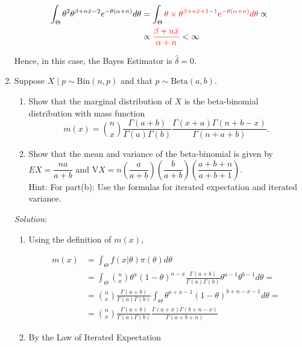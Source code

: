 \documentclass[11pt]{article}
\begin{document}
\begin{enumerate}
\begin{align*}
	\int_{\Theta}{\theta^{2} \theta^{\beta+n\bar{x}-2}e^{-\theta(\alpha+n)} d\theta}	
	&= \int_{\Theta} \textcolor{red}{\theta \times {\theta^{\beta+n\bar{x}+1-1}e^{-\theta(\alpha+n)} d\theta}} \propto \\
																										&\propto \textcolor{red}{\frac{\beta+n\bar{x}}{\alpha+n}} < \infty
\end{align*}

Hence, in this case, the Bayes Estimator is $\hat{\delta} = 0$.

\item Suppose $X\mid p \sim \text{Bin}(n,p)$ and that $p \sim \text{Beta}(a,b).$
\begin{enumerate}
\item Show that the marginal distribution of $X$ is the beta-binomial distribution with mass function 
$$m(x) = {n \choose x} \dfrac{\Gamma(a+b)}{\Gamma(a)\Gamma(b)}
\dfrac{\Gamma(x+a)\Gamma(n+b-x)}{\Gamma(n+a+b)}.
$$
\item Show that the mean and variance of the beta-binomial is given by
$EX = \dfrac{na}{a+b}$ and $\text{V}X = n \left(\dfrac{a}{a+b}\right)\left(\dfrac{b}{a+b}\right)\left(\dfrac{a+b+n}{a+b+1}\right).$\\
Hint: For part(b): Use the formulas for iterated expectation and iterated variance. 
\end{enumerate}

\emph{Solution}:

\begin{enumerate}

\item Using the definition of $m(x)$,

\begin{align*}
m(x)	&= \int_{\Theta}{f(x|\theta)\pi(\theta)d\theta} \\
			&= \int_{\Theta}{{n \choose x}\theta^{x}(1-\theta)^{n-x} \frac{\Gamma(a+b)}{\Gamma(a)\Gamma(b)}\theta^{a-1}\theta^{b-1}d\theta} = \\
			&= {n \choose x}\frac{\Gamma(a+b)}{\Gamma(a)\Gamma(b)} \int_{\Theta}{\theta^{a+x-1}(1-\theta)^{b+n-x-1}d\theta} = \\
			&= {n \choose x}\frac{\Gamma(a+b)}{\Gamma(a)\Gamma(b)} \frac{\Gamma(a+x)\Gamma(b+n-x)}{\Gamma(a+b+n)}
\end{align*}

\item By the Law of Iterated Expectation


\end{enumerate}
\end{enumerate}
\end{document}
